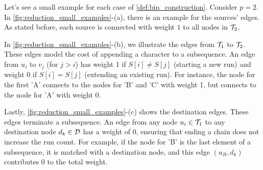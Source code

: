 \begin{example}[Edges]
    Let's see a small example for each case of \cref{def:bip_construction}. Consider $p=2$. In \cref{fig:reduction_small_examples}-(a), there is an example for the sources' edges. As stated before, each source is connected with weight $1$ to all nodes in $\mathcal{T}_{2}$.

    In \cref{fig:reduction_small_examples}-(b), we illustrate the edges from $\mathcal{T}_{1}$ to $\mathcal{T}_{2}$. These edges model the cost of appending a character to a subsequence. An edge from $u_i$ to $v_j$ (for $j>i$) has weight 1 if $S[i] \neq S[j]$ (starting a new run) and weight 0 if $S[i] = S[j]$ (extending an existing run). For instance, the node for the first 'A' connects to the nodes for 'B' and 'C' with weight 1, but connects to the node for 'A' with weight 0.

    Lastly, \cref{fig:reduction_small_examples}-(c) shows the destination edges. These edges terminate a subsequence. An edge from any node $u_i \in \mathcal{T}_{1}$ to any destination node $d_k \in \mathcal{D}$ has a weight of 0, ensuring that ending a chain does not increase the run count. For example, if the node for 'B' is the last element of a subsequence, it is matched with a destination node, and this edge $(u_B, d_k)$ contributes 0 to the total weight.

    \begin{figure}[H]
        \centering
        \begin{subfigure}[b]{0.3\textwidth}
            \centering
\end{subfigure}
\end{figure}
\end{example}
